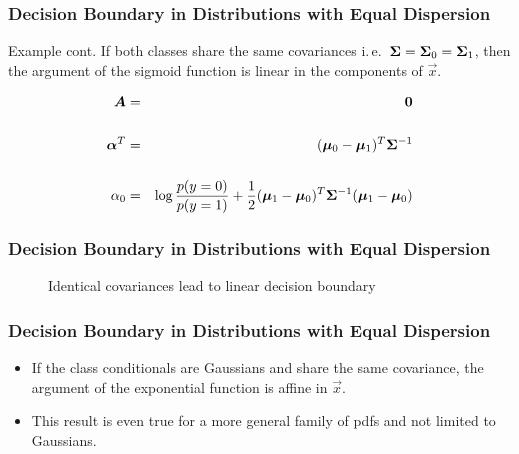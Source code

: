 
 
\begin{frame}
  \frametitle{Decision Boundary in Distributions with Equal Dispersion}
 
  \begin{ovalblock}{Example cont.}
    \small
    If both classes share the same covariances i.\,e.\ ${\bm \Sigma}= {\bm \Sigma}_0={\bm \Sigma}_1$, then the argument of the sigmoid function is linear in the components of $\vec{x}$.
   
    \begin{eqnarray*}
      {\bm A}        &=& {\bm 0} \\[.5cm]
      {\bm \alpha}^T &=& ({\bm \mu}_0 - {\bm \mu}_1)^T {\bm \Sigma}^{-1} \\[.5cm]
      \alpha_0       &=& \log \frac{p(y=0)}{p(y=1)} + 
                         \frac{1}{2}({\bm \mu}_1 - {\bm \mu}_0)^T {\bm \Sigma}^{-1} ({\bm \mu}_1 - {\bm \mu}_0)  
     \end{eqnarray*}
  \end{ovalblock}
\end{frame}


\begin{frame}
  \frametitle{Decision Boundary in Distributions with Equal Dispersion \cont}
   
  \begin{figure}
    \caption{Identical covariances lead to linear decision boundary}
  \end{figure}
\end{frame}


%   


\begin{frame}
  \frametitle{Decision Boundary in Distributions with Equal Dispersion \cont}

  
  \begin{itemize}
    \item If the class conditionals are Gaussians and share the same covariance, the argument of the exponential function is affine in $\vec x$.
    \item This result is even true for a more general family of pdfs and not limited to Gaussians.
  \end{itemize}
\end{frame}


